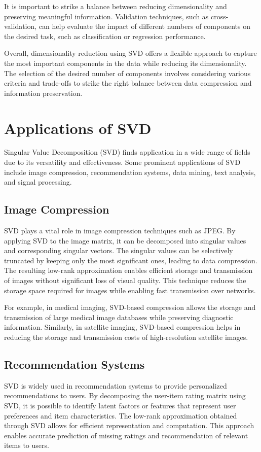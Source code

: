\documentclass[a4paper]{article}
\begin{document}
{		It is important to strike a balance between reducing dimensionality and preserving meaningful information. Validation techniques, such as cross-validation, can help evaluate the impact of different numbers of components on the desired task, such as classification or regression performance.
		
		Overall, dimensionality reduction using SVD offers a flexible approach to capture the most important components in the data while reducing its dimensionality. The selection of the desired number of components involves considering various criteria and trade-offs to strike the right balance between data compression and information preservation.
		
		\section{Applications of SVD}
		Singular Value Decomposition (SVD) finds application in a wide range of fields due to its versatility and effectiveness. Some prominent applications of SVD include image compression, recommendation systems, data mining, text analysis, and signal processing.
		
		\subsection{Image Compression}
		SVD plays a vital role in image compression techniques such as JPEG. By applying SVD to the image matrix, it can be decomposed into singular values and corresponding singular vectors. The singular values can be selectively truncated by keeping only the most significant ones, leading to data compression. The resulting low-rank approximation enables efficient storage and transmission of images without significant loss of visual quality. This technique reduces the storage space required for images while enabling fast transmission over networks.
		
		For example, in medical imaging, SVD-based compression allows the storage and transmission of large medical image databases while preserving diagnostic information. Similarly, in satellite imaging, SVD-based compression helps in reducing the storage and transmission costs of high-resolution satellite images.
		
		\subsection{Recommendation Systems}
		SVD is widely used in recommendation systems to provide personalized recommendations to users. By decomposing the user-item rating matrix using SVD, it is possible to identify latent factors or features that represent user preferences and item characteristics. The low-rank approximation obtained through SVD allows for efficient representation and computation. This approach enables accurate prediction of missing ratings and recommendation of relevant items to users.
		
}
\end{document}
